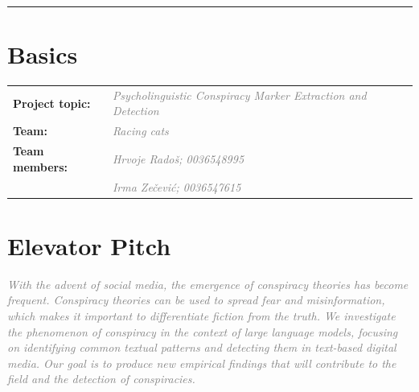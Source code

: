 \documentclass[11pt, a4paper]{article}
\newif\ifinstructions
\newcommand{\explain}[1]{%
  \ifinstructions
    \par\vspace{2pt}%
    {\small\color{exgray} #1}%
    \par\vspace{2pt}%
  \fi
}
\newcommand{\guideline}[1]{%
  \ifinstructions
    \par\vspace{3pt}%
    {\small\color{exgray}\textit{#1}}%
    \par\vspace{1pt}%
  \fi
}
\newcommand{\example}[1]{%
  \ifinstructions
    \par\vspace{1pt}%
    {\small\color{exblue} #1}%
    \par\vspace{4pt}%
  \fi
}
\newcommand{\fillhere}[1]{%
  \par\vspace{2pt}%
  \textit{\textcolor{gray}{#1}}%
  \par\vspace{2pt}%
}
\begin{document}
{\noindent\textcolor{rulegray}{\rule{\linewidth}{0.4pt}}
\vspace{4pt}
\fi

\section{Basics}

\begin{tabular}{@{}ll}
  \textbf{Project topic:} & \fillhere{Psycholinguistic Conspiracy Marker Extraction and Detection}   \\[6pt]
  \textbf{Team:} & \fillhere{Racing cats} \\[2pt]
  \textbf{Team members:}  & \fillhere{Hrvoje Radoš; 0036548995} \\[2pt]
                          & \fillhere{Irma Zečević; 0036547615} \\
\end{tabular}
\section{Elevator Pitch}

\explain{Describe your project in 2--3 sentences as if you had 30 seconds to explain it to someone unfamiliar with the topic. Name the \textbf{problem}, the \textbf{approach}, and the expected \textbf{contribution} --- in that order. Write this section \textbf{last}, even though it appears first. It is the abstract of your abstract.}

\guideline{(1) What problem does your work address, and why does it matter?}
\example{``Despite the rapid growth of NLP benchmarks, most evaluate models in English only, leaving multilingual generalization largely unmeasured.''}

\guideline{(2) What is your approach?}
\example{``We investigate whether cross-lingual transfer from pre-trained multilingual models can close this gap on low-resource Slavic languages.''}

\guideline{(3) What will your work contribute?}
\example{``Our study produces a new benchmark and a set of empirical findings that will inform future multilingual model design.''}

\fillhere{
With the advent of social media, the emergence of conspiracy theories has become frequent. Conspiracy theories can be used to spread fear and misinformation, which makes it important to differentiate fiction from the truth.
We investigate the phenomenon of conspiracy in the context of large language models, focusing on identifying common textual patterns and detecting them in text-based digital media.
Our goal is to produce new empirical findings that will contribute to the field and the detection of conspiracies.
}

}
\end{document}
